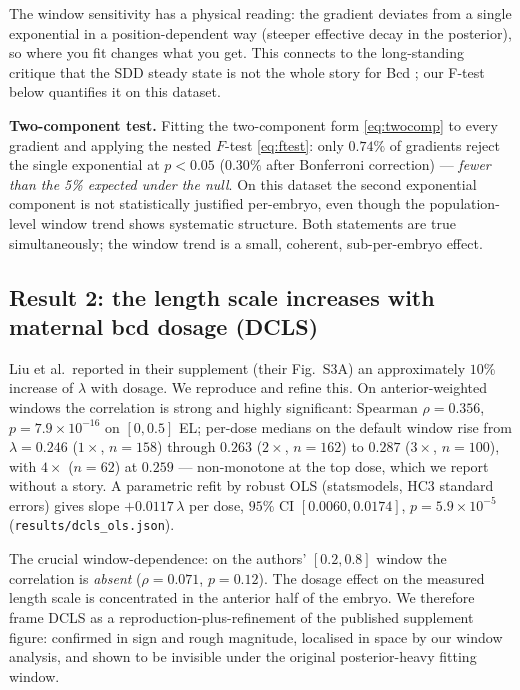 The window sensitivity has a physical reading: the gradient deviates from a
single exponential in a position-dependent way (steeper effective decay in
the posterior), so where you fit changes what you get. This connects to the
long-standing critique that the SDD steady state is not the whole story for
Bcd \cite{spirov2017}; our F-test below quantifies it on this dataset.

\textbf{Two-component test.} Fitting the two-component form
\eqref{eq:twocomp} to every gradient and applying the nested $F$-test
\eqref{eq:ftest}: only $0.74\%$ of gradients reject the single exponential
at $p < 0.05$ ($0.30\%$ after Bonferroni correction) --- \emph{fewer than
the 5\% expected under the null}. On this dataset the second exponential
component is not statistically justified per-embryo, even though the
population-level window trend shows systematic structure. Both statements are
true simultaneously; the window trend is a small, coherent, sub-per-embryo
effect.

\subsection{Result 2: the length scale increases with maternal bcd dosage (DCLS)}
\label{sec:dcls}

Liu et al.\ reported in their supplement (their Fig.~S3A) an approximately
$10\%$ increase of $\lambda$ with dosage. We reproduce and refine this. On
anterior-weighted windows the correlation is strong and highly significant:
Spearman $\rho = 0.356$, $p = 7.9 \times 10^{-16}$ on $[0, 0.5]$ EL; per-dose
medians on the default window rise from $\lambda = 0.246$ ($1\times$,
$n = 158$) through $0.263$ ($2\times$, $n = 162$) to $0.287$ ($3\times$,
$n = 100$), with $4\times$ ($n = 62$) at $0.259$ --- non-monotone at the top
dose, which we report without a story. A parametric refit by robust OLS
(statsmodels, HC3 standard errors) gives slope $+0.0117\,\lambda$ per dose,
$95\%$ CI $[0.0060, 0.0174]$, $p = 5.9 \times 10^{-5}$
(\texttt{results/dcls\_ols.json}).

The crucial window-dependence: on the authors' $[0.2, 0.8]$ window the
correlation is \emph{absent} ($\rho = 0.071$, $p = 0.12$). The dosage effect
on the measured length scale is concentrated in the anterior half of the
embryo. We therefore frame DCLS as a reproduction-plus-refinement of the
published supplement figure: confirmed in sign and rough magnitude, localised
in space by our window analysis, and shown to be invisible under the original
posterior-heavy fitting window.

